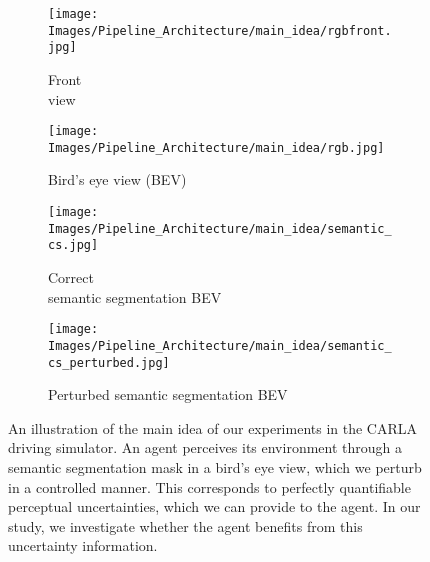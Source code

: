 \begin{figure}[t]
    \centering
    \begin{subfigure}[t]{0.2\columnwidth}
    \centering
        \texttt{[image: Images/Pipeline\_Architecture/main\_idea/rgbfront.jpg]}
        \caption{Front\\view}
    \end{subfigure}
    \begin{subfigure}[t]{0.2\columnwidth}
        \centering
        \texttt{[image: Images/Pipeline\_Architecture/main\_idea/rgb.jpg]}
        \caption{Bird's eye view (BEV)}
    \end{subfigure}
    \begin{subfigure}[t]{0.2\columnwidth}
        \centering
        \texttt{[image: Images/Pipeline\_Architecture/main\_idea/semantic\_cs.jpg]}
        \caption{Correct\\semantic segmentation BEV}
    \end{subfigure}
    \begin{subfigure}[t]{0.2\columnwidth}
        \centering
        \texttt{[image: Images/Pipeline\_Architecture/main\_idea/semantic\_cs\_perturbed.jpg]}
        \caption{Perturbed semantic segmentation BEV}
    \end{subfigure}
    \caption{An illustration of the main idea of our experiments in the CARLA driving simulator. An agent perceives its environment through a semantic segmentation mask in a bird's eye view, which we perturb in a controlled manner. This corresponds to perfectly quantifiable perceptual uncertainties, which we can provide to the agent. In our study, we investigate whether the agent benefits from this uncertainty information.}
    \label{fig:page1-fig}
\end{figure}